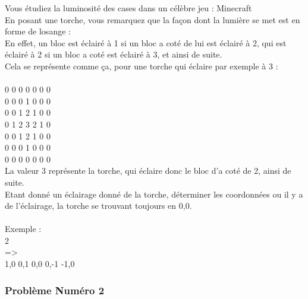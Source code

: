 \documentclass[12pt]{article}
\begin{document}
Vous étudiez la luminosité des cases dans un célèbre jeu : Minecraft\\
En posant une torche, vous remarquez que la façon dont la lumière se met est en forme de losange :\\
En effet, un bloc est éclairé à 1 si un bloc a coté de lui est éclairé à 2, qui est éclairé à 2 si un bloc a coté est éclairé à 3, et ainsi de suite.\\
Cela se représente comme ça, pour une torche qui éclaire par exemple à 3 :
\\\\
0 0 0 0 0 0 0\\
0 0 0 1 0 0 0\\
0 0 1 2 1 0 0\\
0 1 2 3 2 1 0\\
0 0 1 2 1 0 0\\
0 0 0 1 0 0 0\\
0 0 0 0 0 0 0\\

La valeur 3 représente la torche, qui éclaire donc le bloc d'a coté de 2, ainsi de suite.\\
Etant donné un éclairage donné de la torche, déterminer les coordonnées ou il y a de l'éclairage, la torche se trouvant toujours en 0,0.
\\\\
Exemple :\\
2\\
=\textgreater\\
1,0 0,1 0,0 0,-1 -1,0

\subsubsection{Problème Numéro 2}
\end{document}
